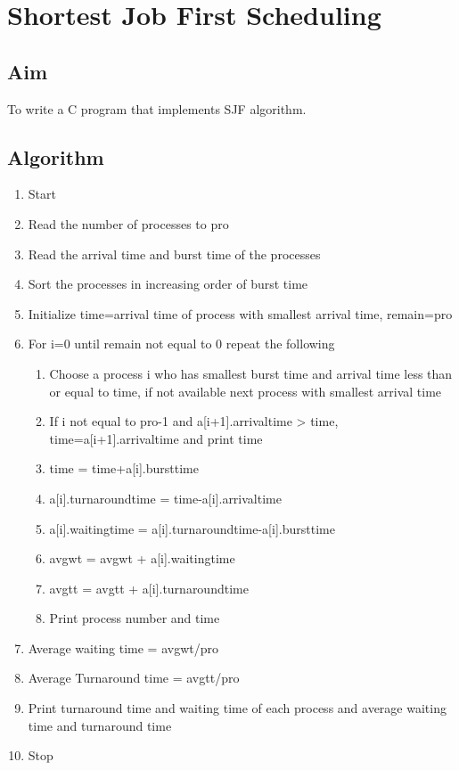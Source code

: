 \documentclass[a4paper]{article}
\begin{document}
\section{Shortest Job First Scheduling}

\subsection{Aim}
To write a C program that implements SJF algorithm.

\subsection{Algorithm}
\begin{enumerate}
\item Start
\item Read the number of processes to pro
\item Read the arrival time and burst time of the processes
\item Sort the processes in increasing order of burst time
\item Initialize time=arrival time of process with smallest arrival time, remain=pro
\item For i=0 until remain not equal to 0 repeat the following
\begin{enumerate}
\item Choose a process i who has smallest burst time and arrival time less than or equal to time, if not available next process with smallest arrival time
\item If i not equal to pro-1 and a[i+1].arrivaltime > time, time=a[i+1].arrivaltime and print time
\item time = time+a[i].bursttime
\item a[i].turnaroundtime = time-a[i].arrivaltime
\item a[i].waitingtime = a[i].turnaroundtime-a[i].bursttime
\item avgwt = avgwt + a[i].waitingtime
\item avgtt = avgtt + a[i].turnaroundtime
\item Print process number and time
\end{enumerate}
\item Average waiting time = avgwt/pro
\item Average Turnaround time = avgtt/pro
\item Print turnaround time and waiting time of each process and average waiting time and turnaround time
\item Stop
\end{enumerate}
\end{document}
